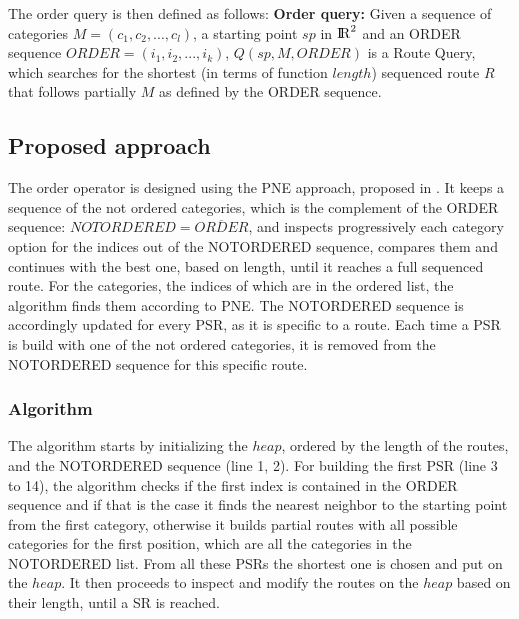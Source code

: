 The order query is then defined as follows: \newline
\textbf{Order query:} Given a sequence of categories $M = (c_1, c_2, ..., c_l)$, a starting point $sp$ in ${\rm I\!R}^2$ and an ORDER sequence $ORDER = (i_1, i_2, ..., i_k)$, $Q(sp, M, ORDER)$ is a Route Query, which searches for the shortest (in terms of function $length$) sequenced route $R$ that follows partially $M$ as defined by the ORDER sequence.


\subsection{Proposed approach} 
\label{sec:approachOrder}
The order operator is designed using the PNE approach, proposed in \cite{OSR}. It keeps a sequence of the not ordered categories, which is the complement of the ORDER sequence: $NOTORDERED = \overline{ORDER}$, and inspects progressively each category option for the indices out of the NOTORDERED sequence, compares them and continues with the best one, based on length, until it reaches a full sequenced route. For the categories, the indices of which are in the ordered list, the algorithm finds them according to PNE. 
The NOTORDERED sequence is accordingly updated for every PSR, as it is specific to a route. Each time a PSR is build with one of the not ordered categories, it is removed from the NOTORDERED sequence for this specific route.

\subsubsection{Algorithm}
\label{sec:algortihmOrder}
The algorithm \texttt{} starts by initializing the $heap$, ordered by the length of the routes, and the NOTORDERED sequence (line 1, 2). For building the first PSR (line 3 to 14), the algorithm checks if the first index is contained in the ORDER sequence and if that is the case it finds the nearest neighbor to the starting point from the first category, otherwise it builds partial routes with all possible categories for the first position, which are all the categories in the NOTORDERED list. From all these PSRs the shortest one is chosen and put on the $heap$. It then proceeds to inspect and modify the routes on the $heap$ based on their length, until a SR is reached. 

